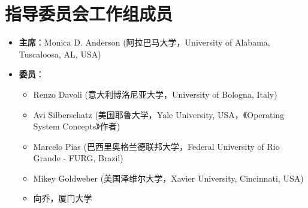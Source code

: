 \newpage
\section{指导委员会工作组成员}

\begin{itemize}\setlength{\itemsep}{0pt}\setlength{\parskip}{0pt}
    \item \textbf{主席}：Monica D. Anderson (阿拉巴马大学，University of Alabama, Tuscaloosa, AL, USA)
    \item \textbf{委员}：
    \begin{itemize}\setlength{\itemsep}{0pt}\setlength{\parskip}{0pt}
        \item Renzo Davoli (意大利博洛尼亚大学，University of Bologna, Italy)
        \item Avi Silberschatz (美国耶鲁大学，Yale University, USA，《Operating System Concepts》作者)
        \item Marcelo Pias (巴西里奥格兰德联邦大学，Federal University of Rio Grande - FURG, Brazil)
        \item Mikey Goldweber (美国泽维尔大学，Xavier University, Cincinnati, USA)
        \item 向乔，厦门大学
    \end{itemize}
\end{itemize}

